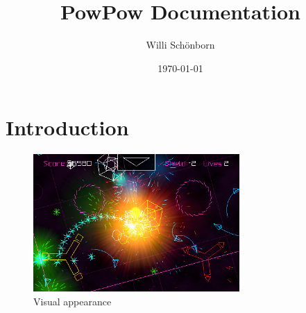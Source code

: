 \documentclass[a4paper]{article}
\title{PowPow Documentation}
\author{Willi Schönborn}
\date{\today}
\begin{document}
\maketitle
\newpage

\tableofcontents
\newpage

\section{Introduction}

\begin{figure}[htbp]
\centering
\includegraphics[width=0.7\textwidth]{PewPew-iPhone-App-Review.jpg}
\caption{Visual appearance}
\end{figure}

\inputminted[firstline=20, lastline=36]{scala}{../scala/org/whiskeysierra/powpow/Ship.scala}

\newpage
\nocite{pewpewgame}
\nocite{jinput}
\printbibliography
{}
\listoffigures
\end{document}

